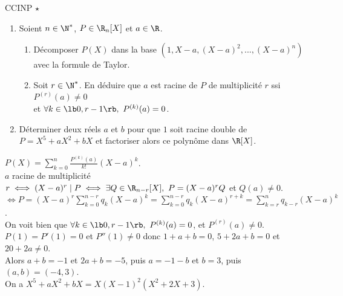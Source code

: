 \documentclass[11pt]{article}
\begin{document}
\begin{exercice}{CCINP $\star$}{}
    \begin{enumerate}
        \item Soient $n\in\N^*$, $P\in\R_n[X]$ et $a\in\R$.
        \begin{enumerate}
            \item Décomposer $P(X)$ dans la base $(1,X-a,(X-a)^2,...,(X-a)^n)$ avec la formule de Taylor.
            \item Soit $r\in\N^*$. En déduire que $a$ est racine de $P$ de multiplicité $r$ ssi $P^{(r)}(a)\neq0$\\ et $\forall k \in\lb0,r-1\rb, ~ P^{(k)}(a)=0$. 
        \end{enumerate}
        \item Déterminer deux réels $a$ et $b$ pour que $1$ soit racine double de $P=X^5+aX^2+bX$ et factoriser alors ce polynôme dans $\R[X]$.
    \end{enumerate}
    \tcblower
     $P(X)=\sum_{k=0}^n\frac{P^{(k)}(a)}{k!}(X-a)^k$.\\
     $a$ racine de multiplicité $r \iff (X-a)^r \mid P \iff \exists Q \in \R_{n-r}[X], ~ P=(X-a)^rQ$ et $Q(a)\neq0$.\\
    $\iff P=(X-a)^r\sum_{k=0}^{n-r}q_k(X-a)^k=\sum_{k=0}^{n-r}q_k(X-a)^{r+k}=\sum_{k=r}^{n}q_{k-r}(X-a)^k$.\\
    On voit bien que $\forall k \in \lb0,r-1\rb,~ P^{(k)}(a)=0$, et $P^{(r)}(a)\neq0$.\\
     $P(1)=P'(1)=0$ et $P''(1)\neq0$ donc $1+a+b=0$, $5+2a+b=0$ et $20+2a\neq0$.\\
    Alors $a+b=-1$ et $2a+b=-5$, puis $a=-1-b$ et $b=3$, puis $(a,b)=(-4,3)$.\\
    On a $X^5+aX^2+bX=X(X-1)^2(X^2+2X+3)$.
\end{exercice}

\end{document}
